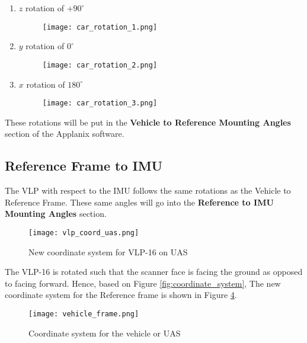 \documentclass[11pt]{article}
\theoremstyle{definition}
\begin{document}
	
	\begin{enumerate}
		\item $z$ rotation of $+90^\circ$  
		\begin{figure}[H]\label{fig: veh_first_rotation}
			\texttt{[image: car\_rotation\_1.png]}	
			
		\end{figure}
		\item  $y$ rotation of $0^\circ$\\
		\begin{figure}[H]\label{fig: veh_second_rotation}
			\texttt{[image: car\_rotation\_2.png]}
			
		\end{figure}
		\pagebreak
		\item $x$ rotation of $180^\circ$
		\begin{figure}[H]\label{fig: veh_third_rotation}
			\texttt{[image: car\_rotation\_3.png]}
			
		\end{figure}
	\end{enumerate}
	
	These rotations will be put in the \textbf{Vehicle to Reference Mounting Angles} section of the Applanix software.  \\
	
	\subsection{Reference Frame to IMU}\label{subsec:ref_to_IMU}
	
	The VLP with respect to the IMU follows the same rotations as the Vehicle to Reference Frame.  These same angles will go into the \textbf{Reference to IMU Mounting Angles} section.  
	
	
	\begin{figure}[h!]
		\texttt{[image: vlp\_coord\_uas.png]}
		\caption{New coordinate system for VLP-16 on UAS}
		\label{fig: UAS_coord}
	\end{figure}
	The VLP-16 is rotated such that the scanner face is facing the ground as opposed to facing forward.  Hence, based on Figure \ref{fig:coordinate_system}, The new coordinate system for the Reference frame is shown in Figure \ref{fig: UAS_coord}.  
	
	\begin{figure}[h!]
		
		\texttt{[image: vehicle\_frame.png]}
		\caption{Coordinate system for the vehicle or UAS}
		\label{sub_fig:vehicle_coord}
	\end{figure}
	
\end{document}
